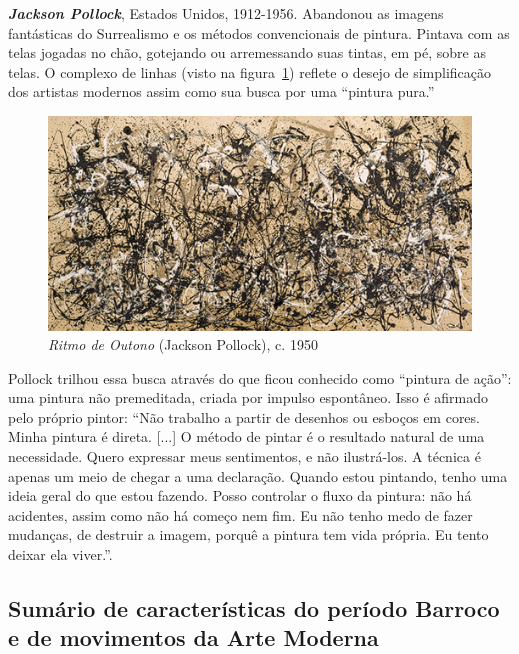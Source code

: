 \textbf{\emph{Jackson Pollock}}, Estados Unidos, 1912-1956. Abandonou
as imagens fantásticas do Surrealismo e os métodos convencionais de
pintura. Pintava com as telas jogadas no chão, gotejando ou
arremessando suas tintas, em pé, sobre as telas. O complexo de linhas
(visto na figura~\ref{fig:pollock:ritmo}) reflete o desejo de
simplificação dos artistas modernos assim como sua busca por uma
``pintura pura.''~\cite{gombrich}

\begin{figure}[h!]
  \begin{center}
  \caption{\emph{Ritmo de Outono} (Jackson Pollock), c. 1950}
  \label{fig:pollock:ritmo}
    \includegraphics[scale=1.2]{figs/pollock_ritmo.png}
  \end{center}
\end{figure}

Pollock trilhou essa busca através do que ficou conhecido como
``pintura de ação'': uma pintura não premeditada, criada por impulso
espontâneo. Isso é afirmado pelo próprio pintor: ``Não trabalho a
partir de desenhos ou esboços em cores. Minha pintura é direta. [...]
O método de pintar é o resultado natural de uma necessidade. Quero
expressar meus sentimentos, e não ilustrá-los. A técnica é apenas um
meio de chegar a uma declaração. Quando estou pintando, tenho uma
ideia geral do que estou fazendo. Posso controlar o fluxo da pintura:
não há acidentes, assim como não há começo nem fim. Eu não tenho medo
de fazer mudanças, de destruir a imagem, porquê a pintura tem vida
própria. Eu tento deixar ela viver.''.~\cite{pollock}

\subsection{Sumário de características do período Barroco e de movimentos da Arte Moderna}
\label{subsec:sumario}

